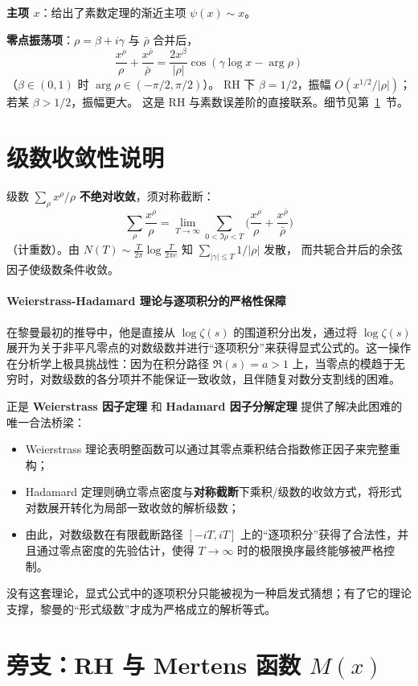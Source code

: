 \textbf{主项 $x$}：给出了素数定理的渐近主项 $\psi(x)\sim x$。

\textbf{零点振荡项}：$\rho=\beta+i\gamma$ 与 $\bar\rho$ 合并后，
\[
\frac{x^{\rho}}{\rho}+\frac{x^{\bar\rho}}{\bar\rho}
=\frac{2x^{\beta}}{|\rho|}\cos(\gamma\log x-\arg\rho)
\]
（$\beta\in(0,1)$ 时 $\arg\rho\in(-\pi/2,\pi/2)$）。
RH 下 $\beta=1/2$，振幅 $O(x^{1/2}/|\rho|)$；若某 $\beta>1/2$，振幅更大。
这是 RH 与素数误差阶的直接联系。细节见第~\ref{sec:convergence}~节。

\section{级数收敛性说明}\label{sec:convergence}

级数 $\sum_{\rho}x^{\rho}/\rho$ \textbf{不绝对收敛}，须对称截断：
\[
\sum_{\rho}\frac{x^{\rho}}{\rho}
=\lim_{T\to\infty}\sum_{0<\Im\rho<T}
\Biggl(\frac{x^{\rho}}{\rho}+\frac{x^{\bar\rho}}{\bar\rho}\Biggr)
\]
（计重数）。由 $N(T)\sim\frac{T}{2\pi}\log\frac{T}{2\pi e}$ 知 $\sum_{|\gamma|\le T}1/|\rho|$ 发散，
而共轭合并后的余弦因子使级数条件收敛。


\paragraph{Weierstrass-Hadamard 理论与逐项积分的严格性保障}
在黎曼最初的推导中，他是直接从 $\log \zeta(s)$ 的围道积分出发，通过将 $\log \zeta(s)$ 展开为关于非平凡零点的对数级数并进行“逐项积分”来获得显式公式的。这一操作在分析学上极具挑战性：因为在积分路径 $\Re(s)=a>1$ 上，当零点的模趋于无穷时，对数级数的各分项并不能保证一致收敛，且伴随复对数分支割线的困难。

正是 \textbf{Weierstrass 因子定理} 和 \textbf{Hadamard 因子分解定理} 提供了解决此困难的唯一合法桥梁：
\begin{itemize}
  \item Weierstrass 理论表明整函数可以通过其零点乘积结合指数修正因子来完整重构；
  \item Hadamard 定理则确立零点密度与\textbf{对称截断}下乘积/级数的收敛方式，将形式对数展开转化为局部一致收敛的解析级数；
  \item 由此，对数级数在有限截断路径 $[-iT, iT]$ 上的“逐项积分”获得了合法性，并且通过零点密度的先验估计，使得 $T \to \infty$ 时的极限换序最终能够被严格控制。
\end{itemize}
没有这套理论，显式公式中的逐项积分只能被视为一种启发式猜想；有了它的理论支撑，黎曼的“形式级数”才成为严格成立的解析等式。


\section{旁支：RH 与 Mertens 函数 \texorpdfstring{$M(x)$}{M(x)}}
\label{sec:mertens-rh}
\label{sec:mertens_rh}
\label{sec:mertens-equivalence}

